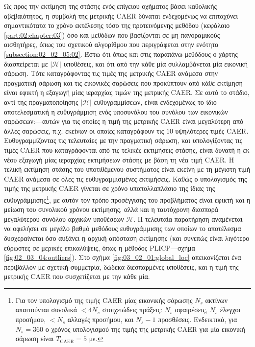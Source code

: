 Ως προς την εκτίμηση της στάσης ενός επίγειου οχήματος βάσει καθολικής
αβεβαιότητος, η συμβολή της μετρικής CAER δύναται ενδεχομένως να επιταχύνει
σημαντικότατα το χρόνο εκτέλεσης τόσο της προτεινόμενης μεθόδου (κεφάλαιο
\ref{part:02:chapter:03}) όσο και μεθόδων που βασίζονται σε μη πανοραμικούς
αισθητήρες, όπως του σχετικού αλγορίθμου που περιγράφεται στην ενότητα
\ref{subsection:02_02_05:02}. Έστω ότι όπως και στις παραπάνω μεθόδους ο χάρτης
διασπείρεται με $|\mathcal{H}|$ υποθέσεις, και ότι από την κάθε μία
συλλαμβάνεται μία εικονική σάρωση. Τότε καταγράφοντας τις τιμές της μετρικής
CAER ανάμεσα στην πραγματική σάρωση και τις εικονικές σαρώσεις που προκύπτουν
από κάθε εκτίμηση είναι εφικτή η εξαγωγή μίας ιεραρχίας τιμών της μετρικής
CAER. Σε αυτό το στάδιο, αντί της πραγματοποίησης $|\mathcal{H}|$
ευθυγραμμίσεων, είναι ενδεχομένως το ίδιο αποτελεσματική η ευθυγράμμιση ενός
υποσυνόλου του συνόλου των εικονικών σαρώσεων:---αυτών για τις οποίες η τιμή
της μετρικής CAER είναι μεγαλύτερη από άλλες σαρώσεις, π.χ. εκείνων οι οποίες
καταγράφουν τις $10$ υψηλότερες τιμές CAER.  Ευθυγραμμίζοντας τις τελευταίες με
την πραγματική σάρωση, και υπολογίζοντας τις τιμές CAER που καταγράφονται από
τις τελικές εκτιμήσεις στάσης, είναι δυνατή η εκ νέου εξαγωγή μίας ιεραρχίας
εκτιμήσεων στάσης με βάση τη νέα τιμή CAER. Η τελική εκτίμηση στάσης του
υποτιθέμενου συστήματος είναι εκείνη με τη μέγιστη τιμή CAER ανάμεσα σε όλες
τις ευθυγραμμισμένες εκτιμήσεις. Καθώς ο υπολογισμός της τιμής της μετρικής
CAER γίνεται σε χρόνο υποπολλαπλάσιο της ίδιας της ευθυγράμμισης\footnote{Για
τον υπολογισμό της τιμής CAER μίας εικονικής σάρωσης $N_s$ ακτίνων απαιτούνται
συνολικά $<4N_s$ στοιχειώδεις πράξεις: $N_s$ αφαιρέσεις, $N_s$ έλεγχοι
προσήμου, $< N_s$ αλλαγές προσήμου, και $N_s-1$ προσθέσεις. Ενδεικτικά, για
$N_s=360$ ο χρόνος υπολογισμού της τιμής της μετρικής CAER για μία εικονική
σάρωση είναι $T_{\text{CAER}} = 5$ μs.}, με αυτόν τον τρόπο προσέγγισης του
προβλήματος είναι εφικτή και η μείωση του συνολικού χρόνου εκτίμησης, αλλά και
η ταυτόχρονη διασπορά μεγαλύτερου συνόλου αρχικών υποθέσεων $\mathcal{H}$. Η
τελευταία παρατήρηση αναμένεται να οφελήσει σε μεγάλο βαθμό μεθόδους
ευθυγράμμισης των οποίων το αποτέλεσμα δυσχεραίνεται όσο αυξάνει η αρχική
απόσταση εκτίμησης (και συνεπώς είναι λιγότερο εύρωστες σε μερικές επικαλύψεις,
όπως η μέθοδος PLICP---σχήμα \ref{fig:02_03_04:outliers}).  Στο σχήμα
\ref{fig:03_02_01:global_loc} απεικονίζεται ένα περιβάλλον με σχετική
συμμετρία, δώδεκα διεσπαρμένες υποθέσεις, και η τιμή της μετρικής CAER που
συσχετίζεται με την κάθε μία.

